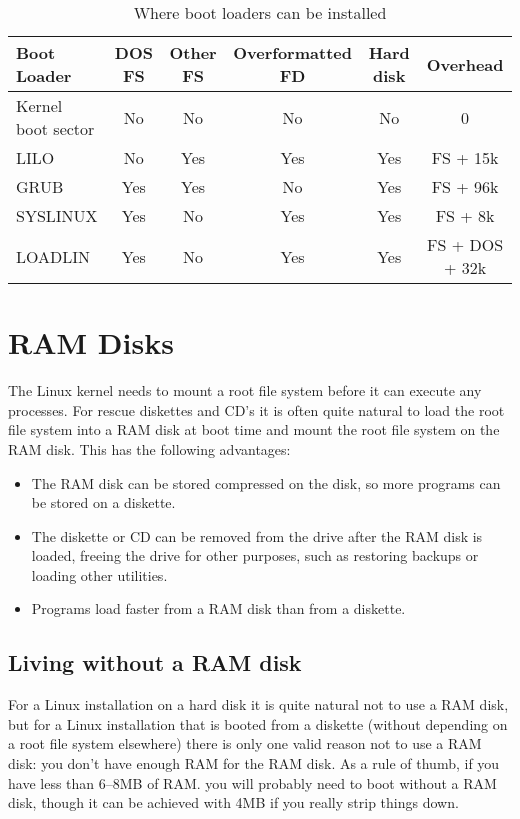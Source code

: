 \documentclass[12pt,a4paper]{article}
\begin{document}
\begin{table}
{\small
\begin{tabular}{|l|c|c|c|c|c|}
\hline
Boot Loader&DOS FS&Other FS & Overformatted FD & Hard disk&Overhead\\
\hline
Kernel boot sector & No & No & No & No & 0\\
LILO & No & Yes & Yes & Yes & FS + 15k\\
GRUB & Yes & Yes & No & Yes & FS + 96k\\
SYSLINUX & Yes & No & Yes & Yes & FS + 8k\\
LOADLIN & Yes & No & Yes & Yes & FS + DOS + 32k\\
\hline
\end{tabular}}
\caption{\label{bltab}Where boot loaders can be installed}
\end{table}


\section{RAM Disks}
\label{ramsect}

The Linux kernel needs to mount a root file system before it can execute
any processes. For rescue diskettes and CD's it is often quite natural
to load the root file system into a RAM disk at boot time and mount
the root file system on the RAM disk. This has the following advantages:
\begin{itemize}
\item The RAM disk can be stored compressed on the disk, so more
  programs can be stored on a diskette.
\item The diskette or CD can be removed from the drive after the RAM
  disk is loaded, freeing the drive for other purposes, such as
  restoring backups or loading other utilities.
\item Programs load faster from a RAM disk than from a diskette.
\end{itemize}

\subsection{Living without a RAM disk}

For a Linux installation on a hard disk it is quite natural not to use
a RAM disk, but for a Linux installation that is booted from a
diskette (without depending on a root file system elsewhere) there is
only one valid reason not to use a RAM disk: you don't have enough RAM
for the RAM disk. As a rule of thumb, if you have less than 6--8MB of
RAM. you will probably need to boot without a RAM disk, though it can
be achieved with 4MB if you really strip things down. 
\end{document}
